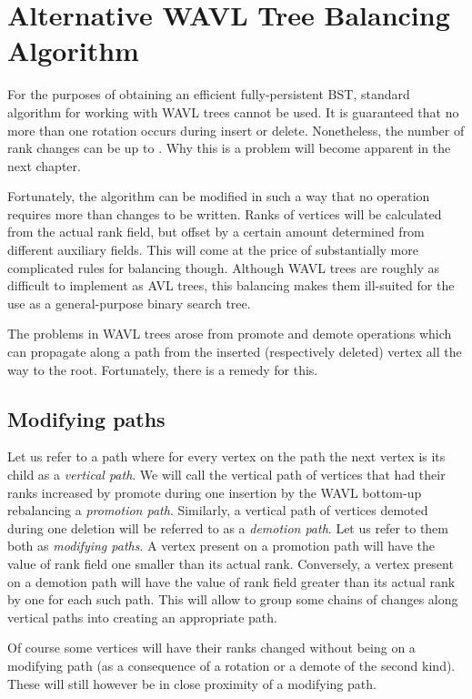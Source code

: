 \chapter{Alternative WAVL Tree Balancing Algorithm}

For the purposes of obtaining an efficient fully-persistent BST, standard algorithm for working with WAVL trees cannot be used. 
It is guaranteed that no more than one rotation occurs during insert or delete. 
Nonetheless, the number of rank changes can be up to . 
Why this is a problem will become apparent in the next chapter.

Fortunately, the algorithm can be modified in such a way that no operation requires more than  changes to be written. 
Ranks of vertices will be calculated from the actual rank field, but offset by a certain amount determined from different auxiliary fields. 
This will come at the price of substantially more complicated rules for balancing though. 
Although WAVL trees are roughly as difficult to implement as AVL trees, this balancing makes them ill-suited for the use as a general-purpose binary search tree. 

The problems in WAVL trees arose from promote and demote operations which can propagate along a path from the inserted (respectively deleted) vertex all the way to the root. 
Fortunately, there is a remedy for this. 

\section{Modifying paths}

Let us refer to a path where for every vertex on the path the next vertex is its child as a {\em vertical path}.
We will call the vertical path of vertices that had their ranks increased by promote during one insertion by the WAVL bottom-up rebalancing a {\em promotion path}. 
Similarly, a vertical path of vertices demoted during one deletion will be referred to as a {\em demotion path}.
Let us refer to them both as {\em modifying paths}.
A vertex present on a promotion path will have the value of rank field one smaller than its actual rank. 
Conversely, a vertex present on a demotion path will have the value of rank field greater than its actual rank by one for each such path. 
This will allow to group some chains of changes along vertical paths into creating an appropriate path.

Of course some vertices will have their ranks changed without being on a modifying path (as a consequence of a rotation or a demote of the second kind). 
These will still however be in close proximity of a modifying path.

